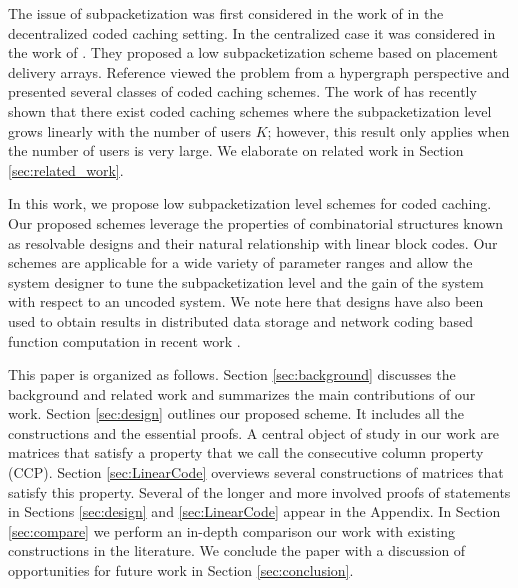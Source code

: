 \documentclass[journal,twocolumn]{IEEEtran}
\theoremstyle{definition}
\begin{document}
The issue of subpacketization was first considered in the work of \cite{shanmugam_et_al14,shanmugam_et_al16} in the decentralized coded caching setting. In the centralized case it was considered in the work of \cite{yan_et_al17}. They proposed a low subpacketization scheme based on placement delivery arrays. Reference \cite{shangguan2016centralized} viewed the problem from a hypergraph perspective and presented several classes of coded caching schemes. The work of \cite{shanmugam2017coded} has recently shown that there exist coded caching schemes where the subpacketization level grows linearly with the number of users $K$; however, this result only applies when the number of users is very large. We elaborate on related work in Section \ref{sec:related_work}.

In this work, we propose low subpacketization level schemes for coded caching. Our proposed schemes leverage the properties of combinatorial structures known as resolvable designs and their natural relationship with linear block codes. Our schemes are applicable for a wide variety of parameter ranges and allow the system designer to tune the subpacketization level and the gain of the system with respect to an uncoded system. We note here that designs have also been used to obtain results in distributed data storage \cite{olmezR16} and network coding based function computation in recent work \cite{tripathyR15,tripathyR17}.



This paper is organized as follows. Section \ref{sec:background} discusses the background and related work and summarizes the main contributions of our work. Section \ref{sec:design} outlines our proposed scheme. It includes all the constructions and the essential proofs. A central object of study in our work are matrices that satisfy a property that we call the consecutive column property (CCP). Section \ref{sec:LinearCode} overviews several constructions of matrices that satisfy this property. Several of the longer and more involved proofs of statements in Sections \ref{sec:design} and \ref{sec:LinearCode} appear in the Appendix. In Section \ref{sec:compare} we perform an in-depth comparison our work with existing constructions in the literature. We conclude the paper with a discussion of opportunities for future work in Section \ref{sec:conclusion}.
\end{document}
